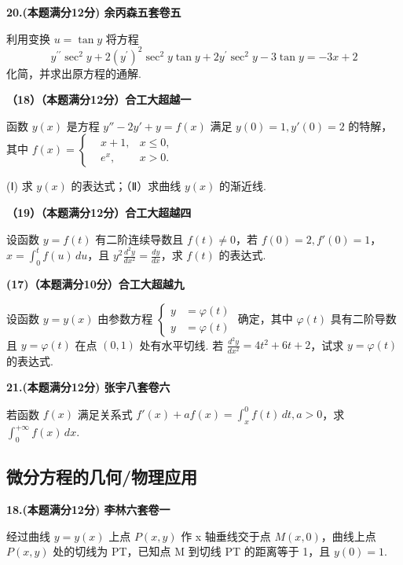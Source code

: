 \documentclass[a4paper,12pt]{article}
\begin{document}
\textbf{20.(本题满分12分) 余丙森五套卷五}

利用变换 $u = \tan y$ 将方程
\[ y^{\prime \prime}\sec^{2}y+2(y^{\prime})^{2}\sec^{2}y\tan y+2y^{\prime}\sec^{2}y-3\tan y=-3x+2 \]
化简，并求出原方程的通解.

\vspace{0.5cm}

\textbf{（18）（本题满分12分）合工大超越一}

函数 $y(x)$ 是方程 $y'' - 2y' + y = f(x)$ 满足 $y(0) = 1, y'(0) = 2$ 的特解，其中 $f(x) = \left\{ \begin{aligned} & x + 1, & x \leqslant 0, \\ & e^{x}, & x > 0. \end{aligned} \right.$

(Ⅰ) 求 $y(x)$ 的表达式；（Ⅱ）求曲线 $y(x)$ 的渐近线.

\vspace{0.5cm}

\textbf{（19）（本题满分12分）合工大超越四}

设函数 $y = f(t)$ 有二阶连续导数且 $f(t) \neq 0$，若 $f(0) = 2, f'(0) = 1$， $x = \int_{0}^{t} f(u) \, du$，且 $y^{2} \frac{d^{2}y}{dx^{2}} = \frac{dy}{dx}$，求 $f(t)$ 的表达式.

\vspace{0.5cm}

\textbf{(17)（本题满分10分）合工大超越九}

设函数 $y = y(x)$ 由参数方程 $\left\{\begin{aligned}y &= \varphi(t)\\ y &= \varphi(t)\end{aligned}\right.$ 确定，其中 $\varphi(t)$ 具有二阶导数且 $y = \varphi(t)$ 在点 $(0,1)$ 处有水平切线. 若 $\frac{d^{2}y}{dx^{2}} = 4t^{2} + 6t + 2$，试求 $y = \varphi(t)$ 的表达式.

\vspace{0.5cm}

\textbf{21.(本题满分12分) 张宇八套卷六}

若函数 $f(x)$ 满足关系式 $f'(x) + af(x) = \int_{x}^{0} f(t) \, dt, a > 0$，求 $\int_{0}^{+\infty} f(x) \, dx$.

\subsection{微分方程的几何/物理应用}

\textbf{18.(本题满分12分) 李林六套卷一}

经过曲线 $y = y(x)$ 上点 $P(x, y)$ 作 x 轴垂线交于点 $M(x, 0)$，曲线上点 $P(x, y)$ 处的切线为 PT，已知点 M 到切线 PT 的距离等于 1，且 $y(0) = 1$.
\end{document}
